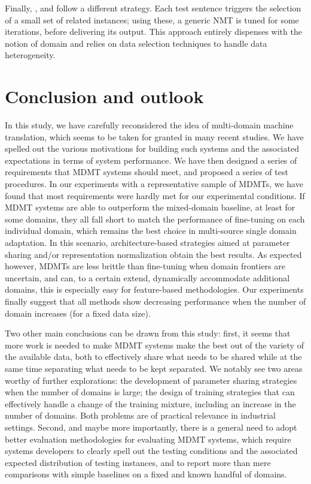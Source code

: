 \documentclass[11pt,a4paper]{article}
\newcommand{\fyDone}[1]{\done[FY]\Todo[FY:]{\textcolor{orange}{#1}}}
\newcommand{\fyFuture}[1]{\done[FY]\Todo[FY:]{\textcolor{red}{#1}}}
\begin{document}
Finally, ,  and  follow a different strategy. Each test sentence triggers the selection of a small set of related instances; using these, a generic NMT is tuned for some iterations, before delivering its output. This approach entirely dispenses with the notion of domain and relies on data selection techniques to handle data heterogeneity.

\section{Conclusion and outlook \label{sec:conclusion}}
\fyDone{Write conclusions}\fyFuture{no mixture of experts}
In this study, we have carefully reconsidered the idea of multi-domain machine translation, which seems to be taken for granted in many recent studies. We have spelled out the various motivations for building such systems and the associated expectations in terms of system performance. We have then designed a series of requirements that MDMT systems should meet, and proposed a series of test procedures. In our experiments with a representative sample of MDMTs, we have found that most requirements were hardly met for our experimental conditions. If MDMT systems are able to outperform the mixed-domain baseline, at least for some domains, they all fall short to match the performance of fine-tuning on each individual domain, which remains the best choice in multi-source single domain adaptation. In this scenario, architecture-based strategies aimed at parameter sharing and/or representation normalization obtain the best results. \fyDone{Mitigate this}
As expected however, MDMTs are less brittle than fine-tuning when domain frontiers are uncertain, and can, to a certain extend, dynamically accommodate additional domains, this is especially easy for feature-based methodologies. Our experiments finally suggest that all methods show decreasing performance when the number of domain increases (for a fixed data size).

Two other main conclusions can be drawn from this study: first, it seems that more work is needed to make MDMT systems make the best out of the variety of the available data, both to effectively share what needs to be shared while at the same time separating what needs to be kept separated. We notably see two areas worthy of further explorations: the development of parameter sharing strategies when the number of domains is large; the design of training strategies that can effectively handle a change of the training mixture, including an increase in the number of domains. Both problems are of practical relevance in industrial settings. Second, and maybe more importantly, there is a general need to adopt better evaluation methodologies for evaluating MDMT systems, which require systems developers to clearly spell out the testing conditions and the associated expected distribution of testing instances, and to report more than mere comparisons with simple baselines on a fixed and known handful of domains.
\end{document}
